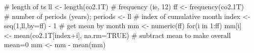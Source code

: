 \begin{Schunk}
\begin{Sinput}
 # length of ts
 ll <- length(co2.1T)
 # frequency (ie, 12)
 ff <- frequency(co2.1T)
 # number of periods (years); %/% is integer division
 periods <- ll %/% ff
 # index of cumulative month
 index <- seq(1,ll,by=ff) - 1
 # get mean by month
 mm <- numeric(ff)
 for(i in 1:ff) {
   mm[i] <- mean(co2.1T[index+i], na.rm=TRUE)
 }
 # subtract mean to make overall mean=0
 mm <- mm - mean(mm)
\end{Sinput}
\end{Schunk}
